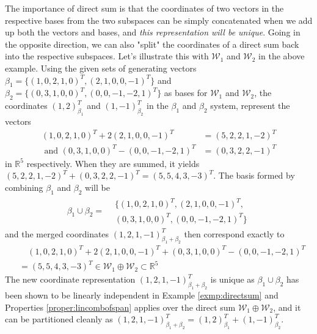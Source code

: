 The importance of direct sum is that the coordinates of two vectors in the respective bases from the two subspaces can be simply concatenated when we add up both the vectors and bases, and \textit{this representation will be unique}. Going in the opposite direction, we can also "split" the coordinates of a direct sum back into the respective subspaces. Let's illustrate this with $\mathcal{W}_1$ and $\mathcal{W}_2$ in the above example. Using the given sets of generating vectors $\mathcal{\beta}_1 = \{(1,0,2,1,0)^T, (2,1,0,0,-1)^T\}$ and $\mathcal{\beta}_2 = \{(0,3,1,0,0)^T, (0,0,-1,-2,1)^T\}$ as bases for $\mathcal{W}_1$ and $\mathcal{W}_2$, the coordinates $(1,2)_{\beta_1}^T$ and $(1,-1)_{\beta_2}^T$ in the $\mathcal{\beta}_1$ and $\mathcal{\beta}_2$ system, represent the vectors 
\begin{align*}
(1,0,2,1,0)^T + 2(2,1,0,0,-1)^T &= (5,2,2,1,-2)^T \\
\text{ and } (0,3,1,0,0)^T - (0,0,-1,-2,1)^T &= (0,3,2,2,-1)^T
\end{align*}
in $\mathbb{R}^5$ respectively. When they are summed, it yields $(5,2,2,1,-2)^T + (0,3,2,2,-1)^T = (5,5,4,3,-3)^T$. The basis formed by combining $\mathcal{\beta}_1$ and $\mathcal{\beta}_2$ will be
\begin{align*}
\mathcal{\beta}_1 \cup \mathcal{\beta}_2 = \begin{aligned}
&\{(1,0,2,1,0)^T, (2,1,0,0,-1)^T, \\ &(0,3,1,0,0)^T,  (0,0,-1,-2,1)^T\}    
\end{aligned}
\end{align*}
and the merged coordinates $(1,2,1,-1)_{\beta_1+\beta_2}^T$ then correspond exactly to
\begin{align*}
&\quad (1,0,2,1,0)^T + 2(2,1,0,0,-1)^T + (0,3,1,0,0)^T - (0,0,-1,-2,1)^T \\
&= (5,5,4,3,-3)^T \in \mathcal{W}_1 \oplus \mathcal{W}_2 \subset \mathbb{R}^5
\end{align*}
The new coordinate representation $(1,2,1,-1)_{\beta_1+\beta_2}^T$ is unique as $\mathcal{\beta}_1 \cup \mathcal{\beta}_2$ has been shown to be linearly independent in Example \ref{exmp:directsum} and Properties \ref{proper:lincombofspan} applies over the direct sum $\mathcal{W}_1 \oplus \mathcal{W}_2$, and it can be partitioned cleanly as $(1,2,1,-1)_{\beta_1+\beta_2}^T = (1,2)_{\beta_1}^T + (1,-1)_{\beta_2}^T$.

